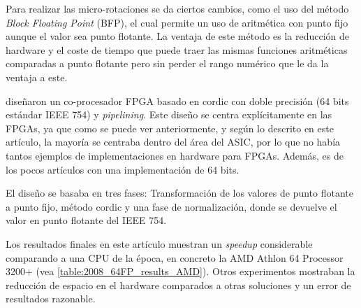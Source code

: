 Para realizar las micro-rotaciones se da ciertos cambios, como el uso del método \textit{Block Floating Point} (BFP), el cual permite un uso de aritmética con punto fijo aunque el valor sea punto flotante. La ventaja de este método es la reducción de hardware y el coste de tiempo que puede traer las mismas funciones aritméticas comparadas a punto flotante pero sin perder el rango numérico que le da la ventaja a este.

\cite{zhou_double_2008} diseñaron un co-procesador FPGA basado en \gls{cordic} con doble precisión (64 bits estándar IEEE 754) y \textit{pipelining}. Este diseño se centra explícitamente en las FPGAs, ya que como se puede ver anteriormente, y según lo descrito en este artículo, la mayoría se centraba dentro del área del ASIC, por lo que no había tantos ejemplos de implementaciones en hardware para FPGAs. Además, es de los pocos artículos con una implementación de 64 bits.

El diseño se basaba en tres fases: Transformación de los valores de punto flotante a punto fijo, método \gls{cordic} y una fase de normalización, donde se devuelve el valor en punto flotante del IEEE 754.

Los resultados finales en este artículo muestran un \textit{speedup} considerable comparando a una CPU de la época, en concreto la AMD Athlon 64 Processor 3200+ (vea \ref{table:2008_64FP_results_AMD}). Otros experimentos mostraban la reducción de espacio en el hardware comparados a otras soluciones y un error de resultados razonable.

\begin{table}[]
	\centering
	\caption{Resultados de 64FP \gls{cordic} y una CPU AMD Athlon 64 Processor 3200+. Num\_C es el número de co-procesadores de \gls{cordic} usados en el experimento.}
	\label{table:2008_64FP_results_AMD}
\end{table}


